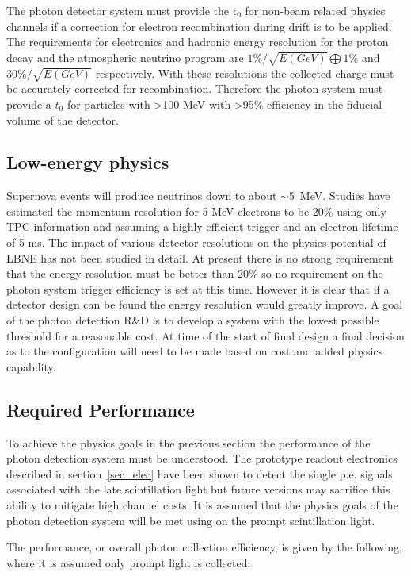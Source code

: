The photon detector system must provide the t$_0$ for non-beam related
physics channels if a correction for electron recombination during
drift is to be applied. The requirements for electronics and hadronic
energy resolution for the proton decay and the atmospheric neutrino
program are $1\% / \sqrt{E(GeV)} \bigoplus 1\%$ and $30\% /
\sqrt{E(GeV)}$ respectively. With these resolutions the collected
charge must be accurately corrected for recombination. Therefore the
photon system must provide a $t_{0}$ for particles with >100 MeV with
>95\% efficiency in the fiducial volume of the detector.

\subsection{Low-energy physics}

Supernova events will produce neutrinos down to about
$\sim$5~MeV. Studies have estimated the momentum resolution for 5 MeV
electrons to be 20\% using only TPC information and assuming a highly
efficient trigger and an electron lifetime of 5 ms. The impact of
various detector resolutions on the physics potential of LBNE has not
been studied in detail. At present there is no strong requirement that
the energy resolution must be better than 20\% so no requirement on
the photon system trigger efficiency is set at this time. However it
is clear that if a detector design can be found the energy resolution
would greatly improve. A goal of the photon detection R\&D is to
develop a system with the lowest possible threshold for a reasonable
cost. At time of the start of final design a final decision as to the
configuration will need to be made based on cost and added physics
capability.

\subsection{Required Performance}

To achieve the physics goals in the previous section the performance
of the photon detection system must be understood. The prototype
readout electronics described in section~\ref{sec_elec} have been
shown to detect the single p.e. signals associated with the late
scintillation light but future versions may sacrifice this ability to
mitigate high channel costs. It is assumed that the physics goals of
the photon detection system will be met using on the prompt
scintillation light.

The performance, or overall photon collection efficiency, is given by
the following, where it is assumed only prompt light is collected:

